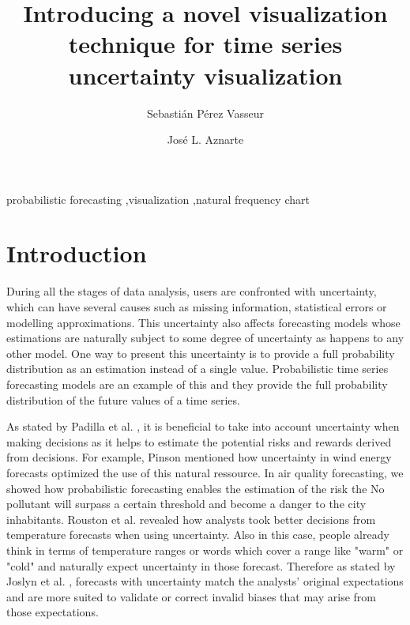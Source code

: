 \documentclass[a4paper,3p,sort&compress]{elsarticle}
\begin{document}
\linenumbers

\newcommand{\no}{NO\textsubscript{2}\xspace}

\begin{frontmatter}

  \title{Introducing a novel visualization technique for time series uncertainty visualization}


  \author{Sebasti\'an P\'erez Vasseur}
  \author{Jos\'e L. Aznarte}
  \address{Artificial Intelligence Department\\Universidad Nacional de
    Educaci\'on a Distancia --- UNED\\c/ Juan del Rosal, 16, Madrid, Spain}
  

\begin{abstract}
  
\end{abstract}

\begin{keyword}
probabilistic forecasting \sep visualization \sep natural frequency chart
\end{keyword}

\end{frontmatter}


\section{Introduction}
\label{sec:intro}

During all the stages of data analysis, users are confronted with uncertainty, which can have 
several causes such as missing information, statistical errors or modelling approximations.
This uncertainty also affects forecasting models whose estimations are naturally 
subject to some degree of uncertainty as happens to any other model. One way to present this 
uncertainty is to provide a full probability distribution as an estimation instead of a single value. 
Probabilistic time series forecasting models are an example of this and they provide the full probability 
distribution of the future values of a time series.

As stated by Padilla et al. \cite{padilla_uncertainty_2021}, it is beneficial to take into account uncertainty when making decisions as it
helps to estimate the potential risks and rewards derived from decisions. For example, Pinson mentioned how uncertainty 
in wind energy forecasts optimized the use of this natural ressource. In air quality forecasting, we showed 
how probabilistic forecasting enables the estimation of the risk the No pollutant will surpass a certain threshold 
and become a danger to the city inhabitants. Rouston et al. \cite{roulston_laboratory_2006} revealed how analysts 
took better decisions from temperature forecasts when using uncertainty.
Also in this case, people already think in terms of temperature ranges or words which cover a range like "warm" or "cold" and naturally
expect uncertainty in those forecast. Therefore as stated by Joslyn et al.
\cite{joslyn_communicating_2010} , 
forecasts with uncertainty match the analysts' original expectations and are more suited to 
validate or correct invalid biases that may arise from those expectations.
\end{document}

